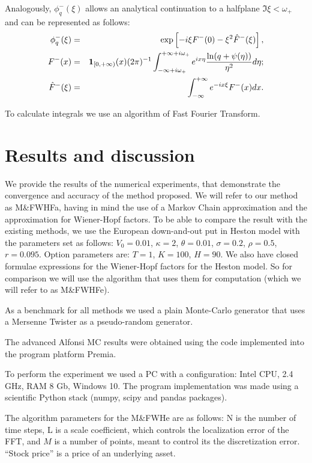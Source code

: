 \documentclass[a4paper]{jpconf}
\begin{document}
Analogously, $\phi^-_q(\xi)$ allows an analytical continuation to a halfplane $\Im \xi<\omega_+$ and can be represented as follows:
\begin{eqnarray*}
	\phi^-_q(\xi)&=&\exp\left[-i\xi F^-(0)-\xi^2\hat{F}^-(\xi)\right],\\
	F^-(x)&=&{\bf 1}_{[0,+\infty)}(x)(2\pi)^{-1}
	\int_{-\infty+i\omega_+}^{+\infty+i\omega_+}e^{ix\eta}\frac{\ln(q+\psi(\eta))}
	{\eta^2}d\eta;\\
	\hat{F}^-(\xi)&=&\int_{-\infty}^{+\infty}e^{-ix\xi}F^-(x)dx.
\end{eqnarray*}

To calculate integrals we use an algorithm of Fast Fourier Transform.

\section{Results and discussion}

We provide the results of the numerical experiments, that demonstrate the convergence and accuracy of the method proposed. We will refer to our method as M\&FWHFa, having in mind the use of a Markov Chain approximation and the approximation for Wiener-Hopf factors. To be able to compare the result with the existing methods, we use the European down-and-out put in Heston model with the parameters set as follows: $V_0=0.01$, $\kappa=2$, $\theta=0.01$, $\sigma=0.2$, $\rho=0.5 $, $r=0.095$. Option parameters are: $T=1$, $K=100$, $H=90$.
We also have closed formulae expressions for the Wiener-Hopf factors for the Heston model. So for comparison we will use the algorithm \cite{kudr_rod} that uses them for computation (which we will refer to as M\&FWHFe).

As a benchmark for all methods we used a plain Monte-Carlo generator that uses a Mersenne Twister as a pseudo-random generator. 

The advanced Alfonsi \cite{alfonsi} MC results were obtained using the code implemented into the program platform Premia.

To perform the experiment we used a PC with a configuration: Intel CPU, 2.4 GHz, RAM 8 Gb, Windows 10. The program implementation was made using a scientific Python stack (numpy, scipy and pandas packages).

The algorithm parameters for the M\&FWHe are as follows: N is the number of time steps, L is a scale coefficient, which controls the localization error of the FFT, and $M$ is a number of points, meant to control its the discretization error. ``Stock price'' is a price of an underlying asset.
\end{document}
